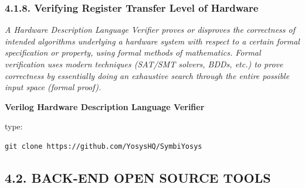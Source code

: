 \documentclass[
]{article}
\begin{document}
\hypertarget{verifying-register-transfer-level-of-hardware}{%
\subsubsection{4.1.8. Verifying Register Transfer Level of
Hardware}\label{verifying-register-transfer-level-of-hardware}}

\emph{A Hardware Description Language Verifier proves or disproves the
correctness of intended algorithms underlying a hardware system with
respect to a certain formal specification or property, using formal
methods of mathematics. Formal verification uses modern techniques
(SAT/SMT solvers, BDDs, etc.) to prove correctness by essentially doing
an exhaustive search through the entire possible input space (formal
proof).}

\textbf{Verilog Hardware Description Language Verifier}

type:

\begin{verbatim}
git clone https://github.com/YosysHQ/SymbiYosys
\end{verbatim}

\hypertarget{back-end-open-source-tools}{%
\subsection{4.2. BACK-END OPEN SOURCE
TOOLS}\label{back-end-open-source-tools}}
\end{document}
